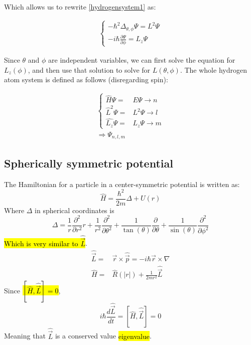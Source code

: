 	Which allows us to rewrite \ref{hydrogensystem1} as:
	
	\begin{align}
		\left\{ \begin{aligned}
			-\hbar^2 \Delta_{\theta, \phi} \Psi = L^2 \Psi \\
			-i\hbar \frac{\partial \Psi}{\partial \phi} = L_z \Psi
		\end{aligned} \right.				
	\end{align}
	
	Since $\theta$ and $\phi$ are independent variables, we can first solve the equation for $L_z(\phi)$, and then use that solution to solve for $L(\theta, \phi)$. The whole hydrogen atom system is defined as follows (disregarding spin):
	
	\begin{align}
		\left\{ \begin{aligned}
			\hat{H} \Psi =& E \Psi \rightarrow n\\
			\hat{L}^2 \Psi =& L^2 \Psi \rightarrow l \\
			\hat{L_z} \Psi =& L_z \Psi  \rightarrow m
		\end{aligned} \right. \\
		\Rightarrow \Psi_{n,l,m}
	\end{align}
	\subsection{Spherically symmetric potential}
		The Hamiltonian for a particle in a center-symmetric potential is written as:
		\begin{equation}
			\hat{H} = \frac{\hbar^2}{2m}\Delta + U(r)
		\end{equation}
		Where $\Delta$ in spherical coordinates is
		\begin{equation}
			\Delta = \frac{1}{r}\frac{\partial^2}{\partial r ^2}r + \frac{1}{r^2} \frac{\partial^2}{\partial \theta^2} + \frac{1}{\tan(\theta)}\frac{\partial}{\partial \theta} + \frac{1}{\sin(\theta)}\frac{\partial^2}{\partial \phi^2}
		\end{equation}
		\hl{Which is very similar to $\hat{\vec{L}}$}.
		\begin{align}
			\hat{\vec{L}} =& \vec{r}\times\hat{\vec{p}} = -i\hbar\vec{r}\times\nabla \\
			\hat{H} =& \hat{R}(|r|) + \frac{1}{2m r^2}\hat{\vec{L}}
		\end{align}
		Since \hl{$\left[\hat{H}, \hat{\vec{L}}\right] = 0$},
		\begin{equation}
			i\hbar\frac{d\hat{\vec{L}}}{dt} = \left[\hat{H}, \hat{\vec{L}}\right] = 0
		\end{equation}
		Meaning that $\hat{\vec{L}}$ is a conserved value \hl{eigenvalue}.
		
